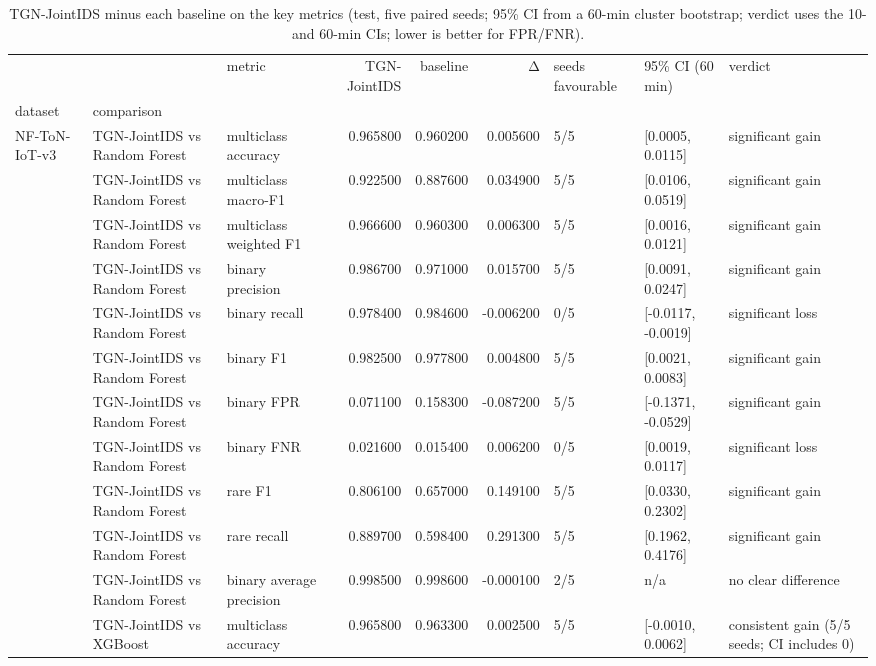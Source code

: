 \begin{table}
\caption{TGN-JointIDS minus each baseline on the key metrics (test, five paired seeds; 95\% CI from a 60-min cluster bootstrap; verdict uses the 10- and 60-min CIs; lower is better for FPR/FNR).}
\label{tab:baselines_paired}
\begin{tabular}{lllrrrlll}
\toprule
 &  & metric & TGN-JointIDS & baseline & Δ & seeds favourable & 95\% CI (60 min) & verdict \\
dataset & comparison &  &  &  &  &  &  &  \\
\midrule
\multirow[t]{55}{*}{NF-ToN-IoT-v3} & TGN-JointIDS vs Random Forest & multiclass accuracy & 0.965800 & 0.960200 & 0.005600 & 5/5 & [0.0005, 0.0115] & significant gain \\
 & TGN-JointIDS vs Random Forest & multiclass macro-F1 & 0.922500 & 0.887600 & 0.034900 & 5/5 & [0.0106, 0.0519] & significant gain \\
 & TGN-JointIDS vs Random Forest & multiclass weighted F1 & 0.966600 & 0.960300 & 0.006300 & 5/5 & [0.0016, 0.0121] & significant gain \\
 & TGN-JointIDS vs Random Forest & binary precision & 0.986700 & 0.971000 & 0.015700 & 5/5 & [0.0091, 0.0247] & significant gain \\
 & TGN-JointIDS vs Random Forest & binary recall & 0.978400 & 0.984600 & -0.006200 & 0/5 & [-0.0117, -0.0019] & significant loss \\
 & TGN-JointIDS vs Random Forest & binary F1 & 0.982500 & 0.977800 & 0.004800 & 5/5 & [0.0021, 0.0083] & significant gain \\
 & TGN-JointIDS vs Random Forest & binary FPR & 0.071100 & 0.158300 & -0.087200 & 5/5 & [-0.1371, -0.0529] & significant gain \\
 & TGN-JointIDS vs Random Forest & binary FNR & 0.021600 & 0.015400 & 0.006200 & 0/5 & [0.0019, 0.0117] & significant loss \\
 & TGN-JointIDS vs Random Forest & rare F1 & 0.806100 & 0.657000 & 0.149100 & 5/5 & [0.0330, 0.2302] & significant gain \\
 & TGN-JointIDS vs Random Forest & rare recall & 0.889700 & 0.598400 & 0.291300 & 5/5 & [0.1962, 0.4176] & significant gain \\
 & TGN-JointIDS vs Random Forest & binary average precision & 0.998500 & 0.998600 & -0.000100 & 2/5 & n/a & no clear difference \\
 & TGN-JointIDS vs XGBoost & multiclass accuracy & 0.965800 & 0.963300 & 0.002500 & 5/5 & [-0.0010, 0.0062] & consistent gain (5/5 seeds; CI includes 0) \\

\end{tabular}
\end{table}
